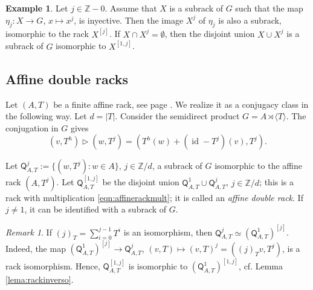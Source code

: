 \documentclass[11pt]{amsart} \textheight 22cm
\renewcommand{\^}[1]{\mbox{$^{\left( #1 \right)}$}}
\renewcommand{\_}[1]{\mbox{$_{\left( #1 \right)}$}}
\newcommand{\trid}{\triangleright}
\newcommand{\Z}{{\mathbb Z}}
\newcommand{\Q}{{\mathsf Q}}
\theoremstyle{plain}
\theoremstyle{definition}
\newtheorem{exa}[lema]{Example}
\theoremstyle{remark}
\newtheorem{obs}[lema]{Remark}
\newcommand\id{\operatorname{id}}
\theoremstyle{remark}
\begin{document}
\begin{exa}\label{exa:rack-expandido}
            Let $j\in \Z - 0$. Assume that $X$ is a subrack of $G$ such
            that the map $\eta_j:X \to G$,  $x\mapsto x^{j}$, is inyective.
            Then the image $X^{j}$ of $\eta_j$ is also a subrack, isomorphic
            to the rack $X^{[j]}$. If $X\cap X^{j} = \emptyset$, then the
            disjoint union $X\cup X^{j}$ is a subrack of $G$ isomorphic to
            $X^{[1,j]}$.
\end{exa}



\medbreak\subsection{Affine double racks}\label{subsec:affines}
Let $(A,T)$ be a finite affine rack, see page
\pageref{page:affinerack}. We realize it as a conjugacy class in
the following way. Let $d = \vert T\vert$. Consider the semidirect
product $G=A\rtimes\langle T\rangle$. The conjugation in $G$ gives
\begin{equation}\label{eqn:affinerackmult}
    (v, T^{h})\trid (w, T^j) = (T^{h}(w) + (\id - T^j)(v) , T^j).
\end{equation}

Let $\Q_{A, T}^{j} := \{(w, T^j): w\in A\}$, $j\in \Z/d$, a
subrack of $G$ isomorphic to the affine rack $(A, T^{j})$. Let
$\Q_{A,T}^{[1,j]}$ be the disjoint union
$\Q_{A,T}^1\cup\Q_{A,T}^j$, $j\in \Z/d$; this is a rack with
multiplication \eqref{eqn:affinerackmult}; it is called an
\emph{affine double rack}. If $j\neq 1$, it can be identified with
a subrack of $G$.




\begin{obs}\label{obs:q1jesq1j}
    If $(j)_T=\sum_{i=0}^{j-1}T^i$ is an isomorphism, then $\Q_{A,T}^j\simeq (\Q_{A,T}^1)^{[j]}$.
    Indeed, the map $(\Q_{A,T}^1)^{[j]}\to\Q_{A,T}^j$, $(v,T) \mapsto (v,T)^j=((j)_T v, T^j)$, is a rack
    isomorphism. Hence, $\Q_{A,T}^{[1,j]}$ is isomorphic to $(\mathsf Q_{A, T}^1)^{[1,j]}$,
cf. Lemma \ref{lema:rackinverso}.
\end{obs}
\end{document}
